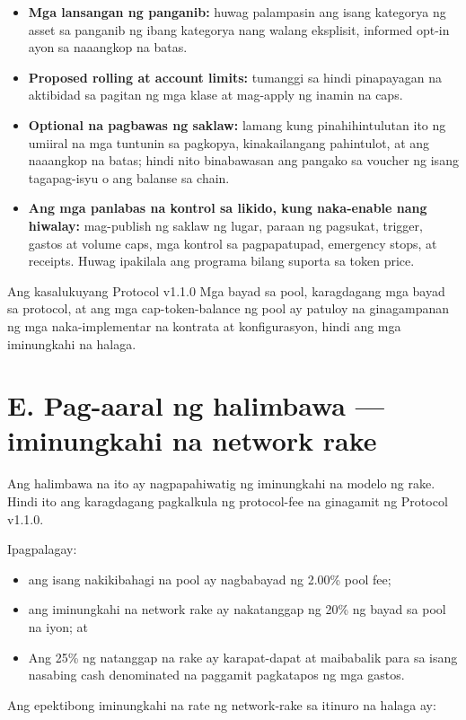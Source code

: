\documentclass[11pt]{article}
\begin{document}
\begin{itemize}[leftmargin=*]
\item \textbf{Mga lansangan ng panganib:} huwag palampasin ang isang kategorya ng asset sa panganib ng ibang kategorya nang walang eksplisit, informed opt-in ayon sa naaangkop na batas.
\item \textbf{Proposed rolling at account limits:} tumanggi sa hindi pinapayagan na aktibidad sa pagitan ng mga klase at mag-apply ng inamin na caps.
\item \textbf{Optional na pagbawas ng saklaw:} lamang kung pinahihintulutan ito ng umiiral na mga tuntunin sa pagkopya, kinakailangang pahintulot, at ang naaangkop na batas; hindi nito binabawasan ang pangako sa voucher ng isang tagapag-isyu o ang balanse sa chain.
\item \textbf{Ang mga panlabas na kontrol sa likido, kung naka-enable nang hiwalay:} mag-publish ng saklaw ng lugar, paraan ng pagsukat, trigger, gastos at volume caps, mga kontrol sa pagpapatupad, emergency stops, at receipts. Huwag ipakilala ang programa bilang suporta sa token price.
\end{itemize}
Ang kasalukuyang Protocol v1.1.0 Mga bayad sa pool, karagdagang mga bayad sa protocol, at ang mga cap-token-balance ng pool ay patuloy na ginagampanan ng mga naka-implementar na kontrata at konfigurasyon, hindi ang mga iminungkahi na halaga.


\section*{E. Pag-aaral ng halimbawa --- iminungkahi na network rake}

Ang halimbawa na ito ay nagpapahiwatig ng iminungkahi na modelo ng rake. Hindi ito ang karagdagang pagkalkula ng protocol-fee na ginagamit ng Protocol v1.1.0.

Ipagpalagay:

\begin{itemize}[leftmargin=*]
\item ang isang nakikibahagi na pool ay nagbabayad ng 2.00\% pool fee;
\item ang iminungkahi na network rake ay nakatanggap ng 20\% ng bayad sa pool na iyon; at
\item Ang 25\% ng natanggap na rake ay karapat-dapat at maibabalik para sa isang nasabing cash denominated na paggamit pagkatapos ng mga gastos.
\end{itemize}
Ang epektibong iminungkahi na rate ng network-rake sa itinuro na halaga ay:
\end{document}
